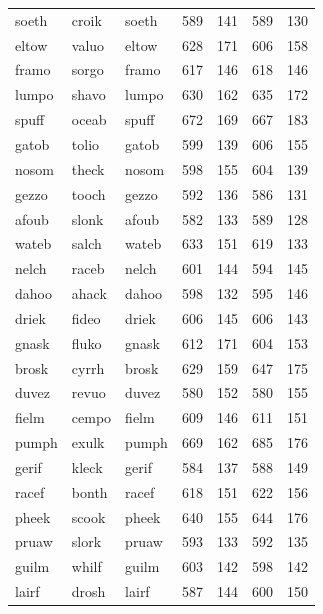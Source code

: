 \documentclass[
]{interact}
\begin{document}
\begin{longtable*}{lllrrrr}
soeth & croik & soeth & 589 & 141 & 589 & 130 \\ 
eltow & valuo & eltow & 628 & 171 & 606 & 158 \\ 
framo & sorgo & framo & 617 & 146 & 618 & 146 \\ 
lumpo & shavo & lumpo & 630 & 162 & 635 & 172 \\ 
spuff & oceab & spuff & 672 & 169 & 667 & 183 \\ 
gatob & tolio & gatob & 599 & 139 & 606 & 155 \\ 
nosom & theck & nosom & 598 & 155 & 604 & 139 \\ 
gezzo & tooch & gezzo & 592 & 136 & 586 & 131 \\ 
afoub & slonk & afoub & 582 & 133 & 589 & 128 \\ 
wateb & salch & wateb & 633 & 151 & 619 & 133 \\ 
nelch & raceb & nelch & 601 & 144 & 594 & 145 \\ 
dahoo & ahack & dahoo & 598 & 132 & 595 & 146 \\ 
driek & fideo & driek & 606 & 145 & 606 & 143 \\ 
gnask & fluko & gnask & 612 & 171 & 604 & 153 \\ 
brosk & cyrrh & brosk & 629 & 159 & 647 & 175 \\ 
duvez & revuo & duvez & 580 & 152 & 580 & 155 \\ 
fielm & cempo & fielm & 609 & 146 & 611 & 151 \\ 
pumph & exulk & pumph & 669 & 162 & 685 & 176 \\ 
gerif & kleck & gerif & 584 & 137 & 588 & 149 \\ 
racef & bonth & racef & 618 & 151 & 622 & 156 \\ 
pheek & scook & pheek & 640 & 155 & 644 & 176 \\ 
pruaw & slork & pruaw & 593 & 133 & 592 & 135 \\ 
guilm & whilf & guilm & 603 & 142 & 598 & 142 \\ 
lairf & drosh & lairf & 587 & 144 & 600 & 150 \\ 
\bottomrule
\end{longtable*}
\end{document}
